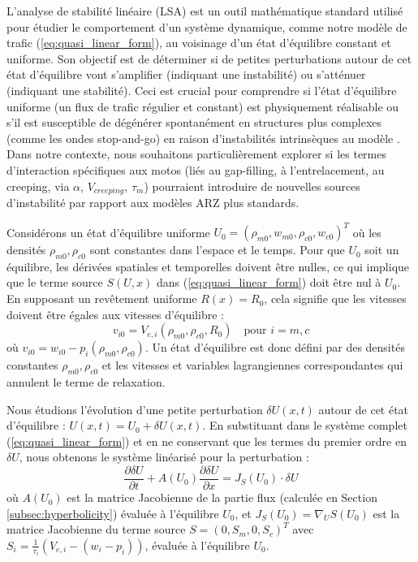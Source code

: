 L'analyse de stabilité linéaire (LSA) est un outil mathématique standard utilisé pour étudier le comportement d'un système dynamique, comme notre modèle de trafic (\ref{eq:quasi_linear_form}), au voisinage d'un état d'équilibre constant et uniforme. Son objectif est de déterminer si de petites perturbations autour de cet état d'équilibre vont s'amplifier (indiquant une instabilité) ou s'atténuer (indiquant une stabilité). Ceci est crucial pour comprendre si l'état d'équilibre uniforme (un flux de trafic régulier et constant) est physiquement réalisable ou s'il est susceptible de dégénérer spontanément en structures plus complexes (comme les ondes stop-and-go) en raison d'instabilités intrinsèques au modèle \cite{LeVeque2002}. Dans notre contexte, nous souhaitons particulièrement explorer si les termes d'interaction spécifiques aux motos (liés au gap-filling, à l'entrelacement, au creeping, via \(\alpha\), \(V_{creeping}\), \(\tau_m\)) pourraient introduire de nouvelles sources d'instabilité par rapport aux modèles ARZ plus standards.

Considérons un état d'équilibre uniforme \( U_0 = (\rho_{m0}, w_{m0}, \rho_{c0}, w_{c0})^T \) où les densités \( \rho_{m0}, \rho_{c0} \) sont constantes dans l'espace et le temps. Pour que \( U_0 \) soit un équilibre, les dérivées spatiales et temporelles doivent être nulles, ce qui implique que le terme source \( S(U, x) \) dans (\ref{eq:quasi_linear_form}) doit être nul à \( U_0 \). En supposant un revêtement uniforme \( R(x) = R_0 \), cela signifie que les vitesses doivent être égales aux vitesses d'équilibre :
\begin{equation}
    v_{i0} = V_{e,i}(\rho_{m0}, \rho_{c0}, R_0) \quad \text{pour } i = m, c
\end{equation}
où \( v_{i0} = w_{i0} - p_i(\rho_{m0}, \rho_{c0}) \). Un état d'équilibre est donc défini par des densités constantes \( \rho_{m0}, \rho_{c0} \) et les vitesses et variables lagrangiennes correspondantes qui annulent le terme de relaxation.

Nous étudions l'évolution d'une petite perturbation \( \delta U(x, t) \) autour de cet état d'équilibre : \( U(x, t) = U_0 + \delta U(x, t) \). En substituant dans le système complet (\ref{eq:quasi_linear_form}) et en ne conservant que les termes du premier ordre en \( \delta U \), nous obtenons le système linéarisé pour la perturbation :
\begin{equation}
    \label{eq:linearized_system}
    \frac{\partial \delta U}{\partial t} + A(U_0) \frac{\partial \delta U}{\partial x} = J_S(U_0) \cdot \delta U
\end{equation}
où \( A(U_0) \) est la matrice Jacobienne de la partie flux (calculée en Section \ref{subsec:hyperbolicity}) évaluée à l'équilibre \( U_0 \), et \( J_S(U_0) = \nabla_U S(U_0) \) est la matrice Jacobienne du terme source \( S = (0, S_m, 0, S_c)^T \) avec \( S_i = \frac{1}{\tau_i}(V_{e,i} - (w_i - p_i)) \), évaluée à l'équilibre \( U_0 \).

